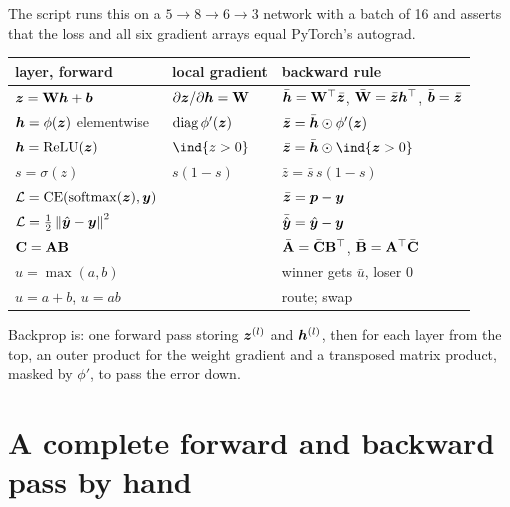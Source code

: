 
The script runs this on a $5\to8\to6\to3$ network with a batch of 16 and asserts that
the loss and all six gradient arrays equal PyTorch's autograd.

\begin{center}
	\small
	\begin{tabular}{lll}
		\toprule
		layer, forward & local gradient & backward rule \\
		\midrule
		${\bm{z}}={\mathbf{W}}{\bm{h}}+{\bm{b}}$ & $\partial{\bm{z}}/\partial{\bm{h}}={\mathbf{W}}$ & $\bar{{\bm{h}}}={\mathbf{W}}^{\top}\bar{{\bm{z}}}$, $\bar{{\mathbf{W}}}=\bar{{\bm{z}}}{\bm{h}}^{\top}$, $\bar{{\bm{b}}}=\bar{{\bm{z}}}$ \\
		${\bm{h}}=\phi({\bm{z}})$ elementwise & $\operatorname{diag}\phi'({\bm{z}})$ & $\bar{{\bm{z}}}=\bar{{\bm{h}}}\odot\phi'({\bm{z}})$ \\
		${\bm{h}}=\operatorname{ReLU}({\bm{z}})$ & $\ind{z>0}$ & $\bar\z=\bar\h\had\ind{\z>0}$ \\
		$s=\sigma(z)$ & $s(1-s)$ & $\bar z=\bar s\,s(1-s)$ \\
		$\mathcal{L}=\operatorname{CE}(\operatorname{softmax}({\bm{z}}),{\bm{y}})$ & & $\bar{{\bm{z}}}=\bm p-{\bm{y}}$ \\
		$\mathcal{L}=\frac12\left\lVert \hat{\bm{y}}-{\bm{y}} \right\rVert^2$ & & $\bar{\hat{\bm{y}}}=\hat{\bm{y}}-{\bm{y}}$ \\
		$\mathbf C={\mathbf{A}}{\mathbf{B}}$ & & $\bar{{\mathbf{A}}}=\bar{\mathbf C}{\mathbf{B}}^{\top}$, $\bar{{\mathbf{B}}}={\mathbf{A}}^{\top}\bar{\mathbf C}$ \\
		$u=\max(a,b)$ & & winner gets $\bar u$, loser $0$ \\
		$u=a+b$, $u=ab$ & & route; swap \\
		\bottomrule
	\end{tabular}
\end{center}

\begin{moral}
	Backprop is: one forward pass storing ${\bm{z}}^{(l)}$ and ${\bm{h}}^{(l)}$, then for each layer
	from the top, an outer product for the weight gradient and a transposed
	matrix product, masked by $\phi'$, to pass the error down.
\end{moral}

\section{A complete forward and backward pass by hand}

